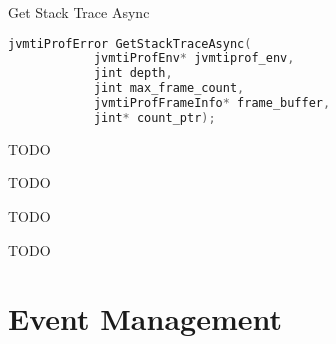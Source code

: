 \begin{apidef}{Get Stack Trace Async}
\begin{lstlisting}[language=C]
jvmtiProfError GetStackTraceAsync(
            jvmtiProfEnv* jvmtiprof_env,
            jint depth,
            jint max_frame_count,
            jvmtiProfFrameInfo* frame_buffer,
            jint* count_ptr);
\end{lstlisting}

\begin{apidesc}
TODO
\end{apidesc}

\begin{apiphase}
TODO
\end{apiphase}

\begin{apicap}
TODO
\end{apicap}

\begin{apiparam}
\end{apiparam}

\begin{apireturn}
TODO
\end{apireturn}

\begin{apierror}
\end{apierror}
\end{apidef}

\section{Event Management} \label{sec:eventmgr}

